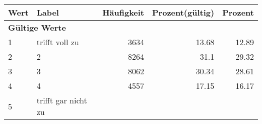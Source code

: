      \begin{longtable}{lXrrr}
     \toprule
     \textbf{Wert} & \textbf{Label} & \textbf{Häufigkeit} & \textbf{Prozent(gültig)} & \textbf{Prozent} \\
     \endhead
     \midrule
     \multicolumn{5}{l}{\textbf{Gültige Werte}}\\

     1 &
     \multicolumn{1}{X}{ trifft voll zu   } &


       \num{3634} &
       \num[round-mode=places,round-precision=2]{13.68} &
         \num[round-mode=places,round-precision=2]{12.89} \\

     2 &
     \multicolumn{1}{X}{ 2   } &


       \num{8264} &
       \num[round-mode=places,round-precision=2]{31.1} &
         \num[round-mode=places,round-precision=2]{29.32} \\

     3 &
     \multicolumn{1}{X}{ 3   } &


       \num{8062} &
       \num[round-mode=places,round-precision=2]{30.34} &
         \num[round-mode=places,round-precision=2]{28.61} \\

     4 &
     \multicolumn{1}{X}{ 4   } &


       \num{4557} &
       \num[round-mode=places,round-precision=2]{17.15} &
         \num[round-mode=places,round-precision=2]{16.17} \\

     5 &
     \multicolumn{1}{X}{ trifft gar nicht zu   } &



\end{longtable}
